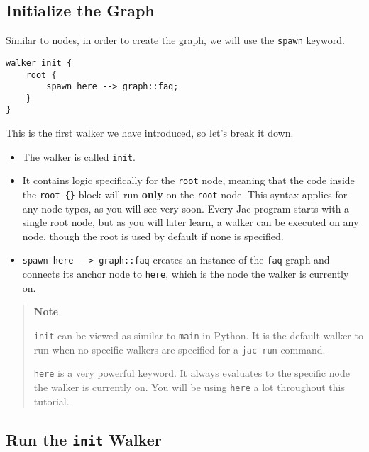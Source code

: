 \hypertarget{initialize-the-graph}{%
\subsection{Initialize the Graph}\label{initialize-the-graph}}

Similar to nodes, in order to create the graph, we will use the
\passthrough{\lstinline!spawn!} keyword.

\begin{lstlisting}
walker init {
    root {
        spawn here --> graph::faq;
    }
}
\end{lstlisting}

This is the first walker we have introduced, so let's break it down.

\begin{itemize}
\tightlist
\item
  The walker is called \passthrough{\lstinline!init!}.
\item
  It contains logic specifically for the \passthrough{\lstinline!root!}
  node, meaning that the code inside the
  \passthrough{\lstinline!root \{\}!} block will run \textbf{only} on
  the \passthrough{\lstinline!root!} node. This syntax applies for any
  node types, as you will see very soon. Every Jac program starts with a
  single root node, but as you will later learn, a walker can be
  executed on any node, though the root is used by default if none is
  specified.
\item
  \passthrough{\lstinline!spawn here --> graph::faq!} creates an
  instance of the \passthrough{\lstinline!faq!} graph and connects its
  anchor node to \passthrough{\lstinline!here!}, which is the node the
  walker is currently on.
\end{itemize}

\begin{quote}
\textbf{Note}

\passthrough{\lstinline!init!} can be viewed as similar to
\passthrough{\lstinline!main!} in Python. It is the default walker to
run when no specific walkers are specified for a
\passthrough{\lstinline!jac run!} command.

\passthrough{\lstinline!here!} is a very powerful keyword. It always
evaluates to the specific node the walker is currently on. You will be
using \passthrough{\lstinline!here!} a lot throughout this tutorial.
\end{quote}

\hypertarget{run-the-init-walker}{%
\subsection{\texorpdfstring{Run the \texttt{init}
Walker}{Run the init Walker}}\label{run-the-init-walker}}

